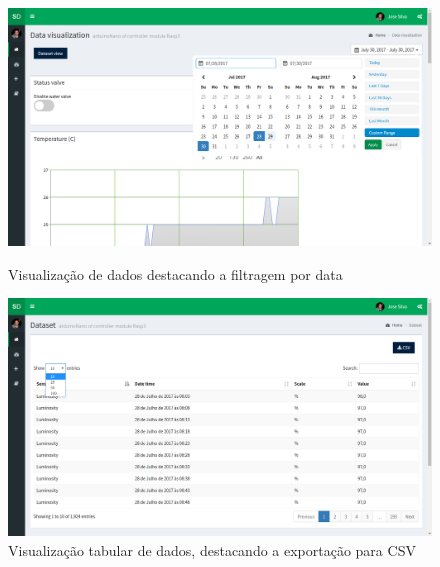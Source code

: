\begin{figure}[h]
	\centering
	\begin{minipage}[b]{0.495\textwidth}
		\centering
		\includegraphics[width=\textwidth]{prints-web/dataview.png}
		\caption{Visualização de dados destacando a filtragem por data}
		\label{view_grap_data}
	\end{minipage}
	\hfill
	\begin{minipage}[b]{0.495\textwidth}
		\centering
		\includegraphics[width=\textwidth]{prints-web/datatab.png}
		\caption{Visualização tabular de dados, destacando a exportação para \ac{CSV}}
		\label{view_tab_data}
	\end{minipage}
\end{figure}



